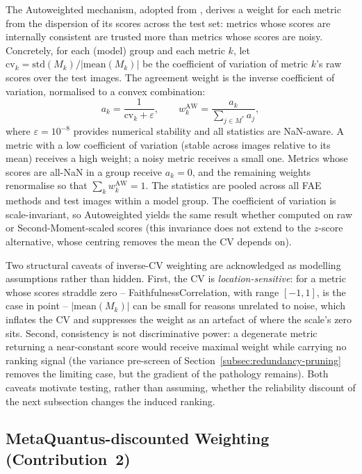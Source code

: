 The Autoweighted mechanism, adopted from \citet{hryniewska2024normensemblexai},
derives a weight for each metric from the dispersion of its scores across the
test set: metrics whose scores are internally consistent are trusted more than
metrics whose scores are noisy. Concretely, for each (model) group and each
metric $k$, let $\mathrm{cv}_k = \mathrm{std}(M_k) / |\mathrm{mean}(M_k)|$ be
the coefficient of variation of metric $k$'s raw scores over the test images.
The agreement weight is the inverse coefficient of variation, normalised to a
convex combination:
\begin{equation}
    a_k = \frac{1}{\mathrm{cv}_k + \varepsilon},
    \qquad
    w_k^{\mathrm{AW}} = \frac{a_k}{\sum_{j \in M^{*}} a_j},
    \label{eq:autoweighted}
\end{equation}
where $\varepsilon = 10^{-8}$ provides numerical stability and all statistics
are NaN-aware. A metric with a low coefficient of variation (stable across
images relative to its mean) receives a high weight; a noisy metric receives a
small one. Metrics whose scores are all-NaN in a group receive $a_k = 0$, and
the remaining weights renormalise so that $\sum_k w_k^{\mathrm{AW}} = 1$.
The statistics are pooled across all FAE methods and test images within a
model group. The
coefficient of variation is scale-invariant, so Autoweighted yields the same
result whether computed on raw or Second-Moment-scaled scores (this
invariance does not extend to the $z$-score alternative, whose centring
removes the mean the CV depends on).

Two structural caveats of inverse-CV weighting are acknowledged as
modelling assumptions rather than hidden. First, the CV is
\emph{location-sensitive}: for a metric whose scores straddle zero --
FaithfulnessCorrelation, with range $[-1, 1]$, is the case in point --
$|\mathrm{mean}(M_k)|$ can be small for reasons unrelated to noise, which
inflates the CV and suppresses the weight as an artefact of where the
scale's zero sits. Second, consistency is not discriminative power: a
degenerate metric returning a near-constant score would receive maximal
weight while carrying no ranking signal (the variance pre-screen of
Section~\ref{subsec:redundancy-pruning} removes the limiting case, but the
gradient of the pathology remains). Both caveats motivate testing, rather
than assuming, whether the reliability discount of the next subsection
changes the induced ranking.

\subsection{MetaQuantus-discounted Weighting (Contribution~2)}
\label{subsec:mq-discount}

